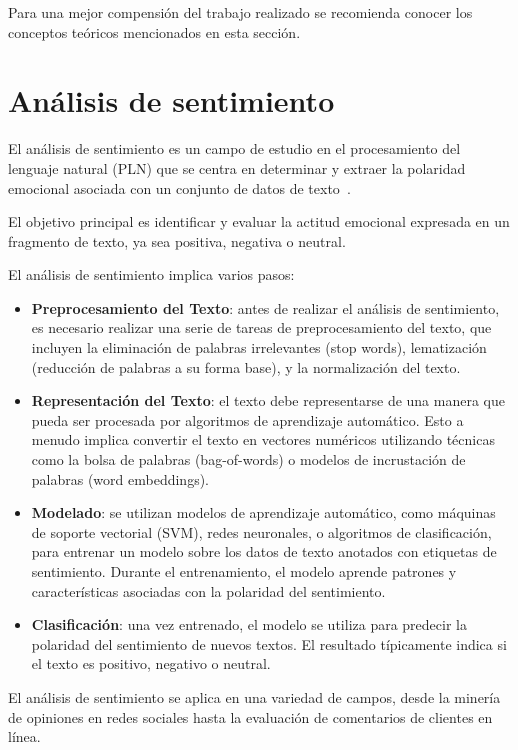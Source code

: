 
Para una mejor compensión del trabajo realizado se recomienda conocer los conceptos teóricos mencionados en esta sección.

\section{Análisis de sentimiento}
El análisis de sentimiento es un campo de estudio en el procesamiento del lenguaje natural (PLN) que se centra en determinar y extraer la polaridad emocional asociada con un conjunto de datos de texto~\cite{Bedrava2022}. 

El objetivo principal es identificar y evaluar la actitud emocional expresada en un fragmento de texto, ya sea positiva, negativa o neutral.

El análisis de sentimiento implica varios pasos:
\begin{itemize}
	\item \textbf{Preprocesamiento del Texto}: antes de realizar el análisis de sentimiento, es necesario realizar una serie de tareas de preprocesamiento del texto, que incluyen la eliminación de palabras irrelevantes (stop words), lematización (reducción de palabras a su forma base), y la normalización del texto.
	\item \textbf{Representación del Texto}: el texto debe representarse de una manera que pueda ser procesada por algoritmos de aprendizaje automático. Esto a menudo implica convertir el texto en vectores numéricos utilizando técnicas como la bolsa de palabras (bag-of-words) o modelos de incrustación de palabras (word embeddings).
	\item \textbf{Modelado}: se utilizan modelos de aprendizaje automático, como máquinas de soporte vectorial (SVM), redes neuronales, o algoritmos de clasificación, para entrenar un modelo sobre los datos de texto anotados con etiquetas de sentimiento. Durante el entrenamiento, el modelo aprende patrones y características asociadas con la polaridad del sentimiento.
	\item \textbf{Clasificación}: una vez entrenado, el modelo se utiliza para predecir la polaridad del sentimiento de nuevos textos. El resultado típicamente indica si el texto es positivo, negativo o neutral.
\end{itemize}

El análisis de sentimiento se aplica en una variedad de campos, 
desde la minería de opiniones en redes sociales hasta la 
evaluación de comentarios de clientes en línea. 


